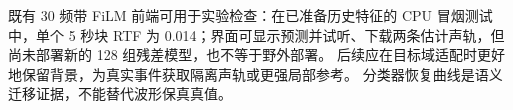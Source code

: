 \documentclass[conference]{IEEEtran}
\begin{document}
既有 30 频带 FiLM 前端可用于实验检查：在已准备历史特征的 CPU 冒烟测试中，单个 5 秒块 RTF 为 0.014；界面可显示预测并试听、下载两条估计声轨，但尚未部署新的 128 组残差模型，也不等于野外部署。
后续应在目标域适配时更好地保留背景，为真实事件获取隔离声轨或更强局部参考。
分类器恢复曲线是语义迁移证据，不能替代波形保真真值。



\end{document}

